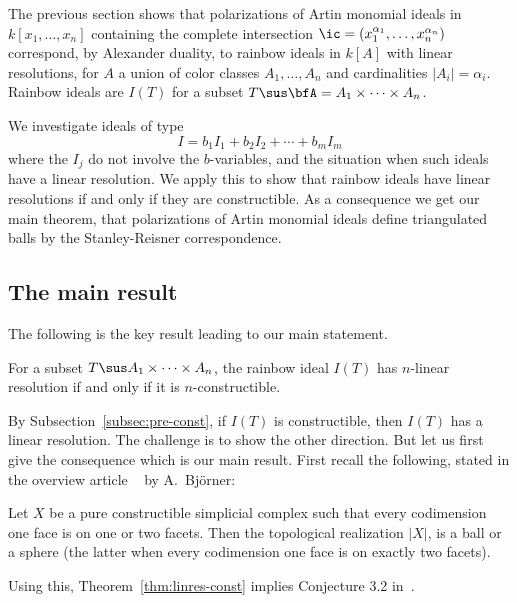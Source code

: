 The previous section shows that
polarizations of
Artin monomial ideals in $k[x_1, \ldots, x_n]$
containing the complete intersection $\ic = (x_1^{\alpha_1},
\ldots, x_n^{\alpha_n})$
correspond, by Alexander duality, to rainbow ideals in $k[A]$ with linear resolutions,
for $A$ a union of color classes
$A_1, \ldots, A_n$ and cardinalities $|A_i|= \alpha_i$.
Rainbow ideals
are $I(T)$ for a subset $T \sus \bfA = A_1 \times \cdots \times A_n$.

We investigate ideals of type
\[ I = b_1 I_1 + b_2 I_2 + \cdots + b_m I_m \]
where the $I_j$ do not involve the $b$-variables, and the situation
when such ideals have a linear resolution.
We apply this to show that rainbow ideals have
linear resolutions if and only if they
are constructible. As a consequence we get our main theorem,
that polarizations of Artin monomial ideals define triangulated
balls by the Stanley-Reisner correspondence.

\subsection{The main result}

The following is the key result leading to our main statement.
  
 \begin{theo} \label{thm:linres-const} For a subset
   $T \sus A_1 \times \cdots \times A_n$,
   the rainbow ideal $I(T)$ has $n$-linear resolution if and
   only if it is $n$-constructible.
  \end{theo}

  By Subsection~\ref{subsec:pre-const}, if  $I(T)$ is constructible, then
  $I(T)$ has a linear resolution. The challenge is to show the other direction.
  But let us first give the consequence which is our main result.
  First recall the following, stated in the overview article
 ~\cite[Thm.~11.4]{Bj95} by A.~Bj\"orner:


\begin{theo} \label{thm:bjorner}
Let $X$ be a pure constructible simplicial complex
    such that every codimension one face is on one or two facets.
    Then the topological realization $|X|$, is a ball or a sphere
    (the latter when every codimension one face is on exactly two
    facets).
\end{theo}
  
Using this, Theorem~\ref{thm:linres-const} implies Conjecture 3.2 in~\cite{AFL}.


